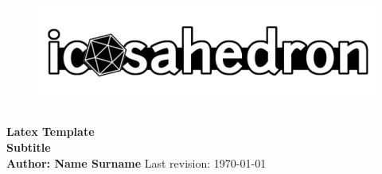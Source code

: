 \begin{titlepage}
\begin{center}

\pagecolor{white}\afterpage{\nopagecolor}

\vspace{0.25cm}
\begin{figure}[H]
    \centering
    \includegraphics[width=\textwidth/2]{images/logo_finale.png}
\end{figure}

\HRule\\[0.2cm]
{\huge\bfseries Latex Template}
\HRule\\[1.5cm]

\huge\textbf{Subtitle}\\
\textbf{\small Author: Name Surname}
\vfill\vfill
\large{Last revision: \today}

\end{center}
\end{titlepage}